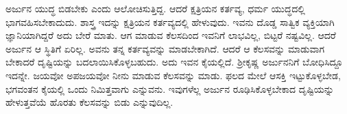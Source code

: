 ಅರ್ಜುನ ಯುದ್ಧ ಬಿಡಬೇಕು ಎಂದು ಆಲೋಚಿಸುತ್ತಿದ್ದ. ಆದರೆ ಕ್ಷತ್ರಿಯನ ಕರ್ತವ್ಯ, ಧರ್ಮ ಯುದ್ಧದಲ್ಲಿ ಭಾಗವಹಿಸಬೇಕಾದುದು. ಶಾಸ್ತ್ರ ಇದನ್ನು ಕ್ಷತ್ರಿಯನ ಕರ್ತವ್ಯದಲ್ಲಿ ಹೇಳುವುದು. ಇವನು ದೊಡ್ಡ ಸಾತ್ವಿಕ ವ್ಯಕ್ತಿಯಾಗಿ ಜ್ಞಾನಿಯಾಗಿದ್ದರೆ ಅದು ಬೇರೆ ಮಾತು. ಆಗ ಮಾಡುವ ಕೆಲಸದಿಂದ ಇವನಿಗೆ ಲಾಭವಿಲ್ಲ, ಬಿಟ್ಟರೆ ನಷ್ಟವಿಲ್ಲ. ಆದರೆ ಅರ್ಜುನ ಆ ಸ್ಥಿತಿಗೆ ಏರಿಲ್ಲ. ಅವನು ತನ್ನ ಕರ್ತವ್ಯವನ್ನು ಮಾಡಬೇಕಾಗಿದೆ. ಆದರೆ ಆ ಕೆಲಸವನ್ನು ಮಾಡುವಾಗ ಬೇಕಾದರೆ ದೃಷ್ಟಿಯನ್ನು ಬದಲಾಯಿಸಿಕೊಳ್ಳಬಹುದು. ಅದು ಇವನ ಕೈಯಲ್ಲಿದೆ. ಶ‍್ರೀಕೃಷ್ಣ ಅರ್ಜುನನಿಗೆ ಬೋಧಿಸಿದ್ದೂ ಇದನ್ನೇ. ಜಯವೋ ಅಪಜಯವೋ ನೀನು ಮಾಡುವ ಕೆಲಸವನ್ನು ಮಾಡು. ಫಲದ ಮೇಲೆ ಆಸಕ್ತಿ ಇಟ್ಟುಕೊಳ್ಳಬೇಡ, ಭಗವಂತನ ಕೈಯಲ್ಲಿ ಒಂದು ನಿಮಿತ್ತವಾಗು ಎನ್ನುವನು. ಇವುಗಳೆಲ್ಲ ಅರ್ಜುನ ರೂಢಿಸಿಕೊಳ್ಳಬೇಕಾದ ದೃಷ್ಟಿಯನ್ನು ಹೇಳುತ್ತವೆಯೆ ಹೊರತು ಕೆಲಸವನ್ನು ಬಿಡು ಎನ್ನುವುದಿಲ್ಲ.

